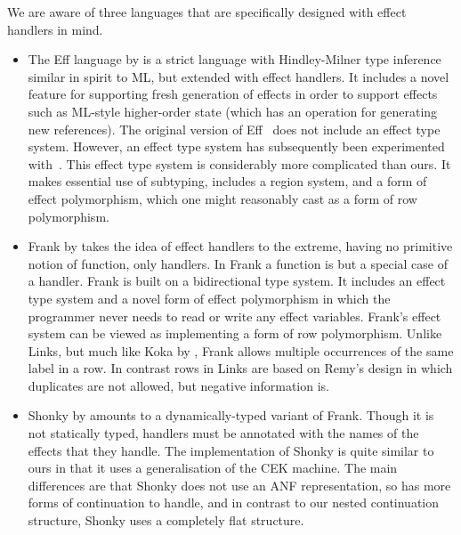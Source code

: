 \documentclass[mscres,cdtppar,twoside,openright,logo,rightchapter,normalheadings]{infthesis}
\theoremstyle{definition}
\begin{document}
We are aware of three languages that are specifically designed with
effect handlers in mind.
%
\begin{itemize}
\item The Eff language by \cite{Bauer2015} is a strict language with
  Hindley-Milner type inference similar in spirit to ML, but extended
  with effect handlers.
%
It includes a novel feature for supporting fresh generation of effects
in order to support effects such as ML-style higher-order state (which
has an operation for generating new references).
%
The original version of Eff~\citep{Bauer2015} does not include an
effect type system. However, an effect type system has subsequently
been experimented with~\citep{BauerP13, Pretnar2014}.
%
This effect type system is considerably more complicated than ours. It
makes essential use of subtyping, includes a region system, and a form
of effect polymorphism, which one might reasonably cast as a form of
row polymorphism.

\item Frank by \cite{McBride2014} takes the idea of effect handlers to
  the extreme, having no primitive notion of function, only
  handlers. In Frank a function is but a special case of a handler.
  Frank is built on a bidirectional type system. It includes an effect
  type system and a novel form of effect polymorphism in which the
  programmer never needs to read or write any effect
  variables. Frank's effect system can be viewed as implementing a
  form of row polymorphism. Unlike Links, but much like
  Koka by \cite{Leijen14}, Frank allows multiple occurrences of the same
  label in a row. In contrast rows in Links are based on Remy's design
  in which duplicates are not allowed, but negative information is.

\item Shonky by \cite{McBride2016} amounts to a dynamically-typed variant
  of Frank. Though it is not statically typed, handlers must be
  annotated with the names of the effects that they handle. The
  implementation of Shonky is quite similar to ours in that it uses a
  generalisation of the CEK machine. The main differences are that
  Shonky does not use an ANF representation, so has more forms of
  continuation to handle, and in contrast to our nested continuation
  structure, Shonky uses a completely flat structure.
\end{itemize}
\end{document}
